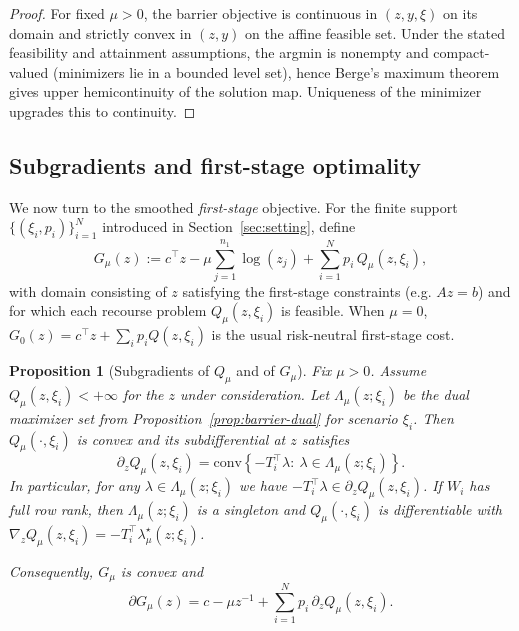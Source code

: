\documentclass[11pt]{article}
\theoremstyle{plain}
\newtheorem{proposition}[theorem]{Proposition}
\theoremstyle{definition}
\theoremstyle{remark}
\newcommand{\conv}{\mathrm{conv}}
\begin{document}
\begin{proof}
For fixed $\mu>0$, the barrier objective is continuous in $(z,y,\xi)$ on its domain and strictly convex
in $(z,y)$ on the affine feasible set. Under the stated feasibility and attainment assumptions, the
argmin is nonempty and compact-valued (minimizers lie in a bounded level set), hence Berge's
maximum theorem gives upper hemicontinuity of the solution map. Uniqueness of the minimizer
upgrades this to continuity.
\end{proof}

\subsection{Subgradients and first-stage optimality}\label{subsec:barrier:grad}

We now turn to the smoothed \emph{first-stage} objective.
For the finite support $\{(\xi_i,p_i)\}_{i=1}^N$ introduced in Section~\ref{sec:setting}, define
\[
G_\mu(z)
:= c^\top z - \mu\sum_{j=1}^{n_1}\log(z_j) + \sum_{i=1}^N p_i\,Q_\mu(z,\xi_i),
\]
with domain consisting of $z$ satisfying the first-stage constraints (e.g. $Az=b$) and for which each
recourse problem $Q_\mu(z,\xi_i)$ is feasible.
When $\mu=0$, $G_0(z)=c^\top z+\sum_i p_iQ(z,\xi_i)$ is the usual risk-neutral first-stage cost.

\begin{proposition}[Subgradients of $Q_\mu$ and of $G_\mu$]\label{prop:grad}
Fix $\mu>0$. Assume $Q_\mu(z,\xi_i)<+\infty$ for the $z$ under consideration. Let
$\Lambda_\mu(z;\xi_i)$ be the dual maximizer set from Proposition~\ref{prop:barrier-dual} for scenario
$\xi_i$. Then $Q_\mu(\cdot,\xi_i)$ is convex and its subdifferential at $z$ satisfies
\begin{equation}\label{eq:subgrad-Qmu}
\partial_z Q_\mu(z,\xi_i)
=
\conv\left\{-T_i^\top\lambda:\ \lambda\in\Lambda_\mu(z;\xi_i)\right\}.
\end{equation}
In particular, for any $\lambda\in\Lambda_\mu(z;\xi_i)$ we have $-T_i^\top\lambda\in\partial_z Q_\mu(z,\xi_i)$.
If $W_i$ has full row rank, then $\Lambda_\mu(z;\xi_i)$ is a singleton and $Q_\mu(\cdot,\xi_i)$ is
differentiable with $\nabla_z Q_\mu(z,\xi_i)=-T_i^\top\lambda_\mu^\star(z;\xi_i)$.

Consequently, $G_\mu$ is convex and
\begin{equation}\label{eq:subgrad-Gmu}
\partial G_\mu(z)
=
c-\mu z^{-1} + \sum_{i=1}^N p_i\,\partial_z Q_\mu(z,\xi_i).
\end{equation}
\end{proposition}
\end{document}
